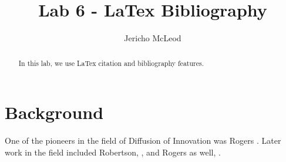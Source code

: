 \documentclass[11pt]{article}
\title{Lab 6 - LaTex Bibliography}
\author{Jericho McLeod}
\begin{document}
\maketitle

\begin{abstract}
In this lab, we use LaTex citation and bibliography features.
\end{abstract}

\section{Background}

One of the pioneers in the field of Diffusion of Innovation was Rogers \cite{Rogers61}. Later work in the field included Robertson, \cite{Robertson67}, and Rogers as well, \cite{Rogers76}.



\end{document}

